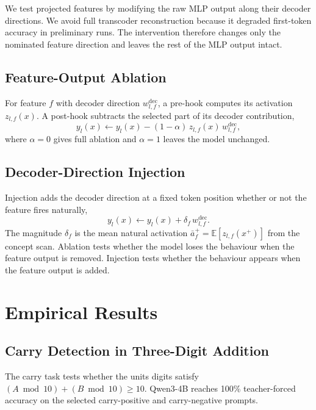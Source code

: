 We test projected features by modifying the raw MLP output along their decoder
directions. We avoid full transcoder reconstruction because it degraded
first-token accuracy in preliminary runs. The intervention therefore changes only
the nominated feature direction and leaves the rest of the MLP output intact.

\subsection{Feature-Output Ablation}
\label{sec:ablation}

For feature \(f\) with decoder direction \(w_{l,f}^{\mathrm{dec}}\), a pre-hook
computes its activation \(z_{l,f}(x)\). A post-hook subtracts the selected part of
its decoder contribution,
\begin{equation}
y_l(x) \leftarrow y_l(x) - (1-\alpha)\, z_{l,f}(x)\, w_{l,f}^{\mathrm{dec}},
\label{eq:ablation}
\end{equation}
where \(\alpha=0\) gives full ablation and \(\alpha=1\) leaves the model unchanged.

\subsection{Decoder-Direction Injection}
\label{sec:injection}

Injection adds the decoder direction at a fixed token position whether or not the
feature fires naturally,
\begin{equation}
y_l(x) \leftarrow y_l(x) + \delta_f\, w_{l,f}^{\mathrm{dec}}.
\label{eq:injection}
\end{equation}
The magnitude \(\delta_f\) is the mean natural activation
\(\bar{a}_f^+=\mathbb{E}[z_{l,f}(x^+)]\) from the concept scan. Ablation tests
whether the model loses the behaviour when the feature output is removed. Injection
tests whether the behaviour appears when the feature output is added.

\section{Empirical Results}
\label{sec:concept_results}

\subsection{Carry Detection in Three-Digit Addition}
\label{sec:carry_results}

The carry task tests whether the units digits satisfy
\((A \bmod 10)+(B \bmod 10)\geq 10\). Qwen3-4B reaches 100\%
teacher-forced accuracy on the selected carry-positive and carry-negative prompts.

